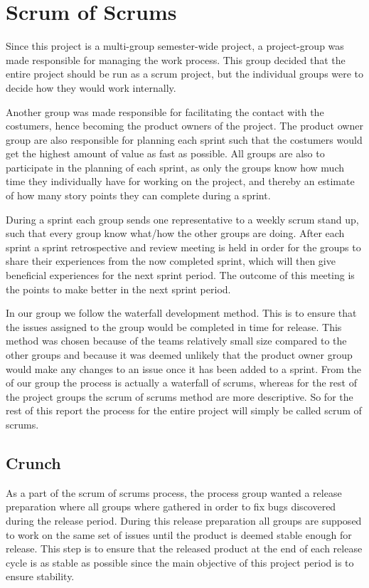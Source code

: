 \section{Scrum of Scrums}
Since this project is a multi-group semester-wide project, a project-group was made responsible for managing the work process.
This group decided that the entire project should be run as a scrum project, but the individual groups were to decide how they would work internally.

Another group was made responsible for facilitating the contact with the costumers, hence becoming the product owners of the project.
The product owner group are also responsible for planning each sprint such that the costumers would get the highest amount of value as fast as possible.
All groups are also to participate in the planning of each sprint, as only the groups know how much time they individually have for working on the project, and thereby an estimate of how many story points they can complete during a sprint.

During a sprint each group sends one representative to a weekly scrum stand up, such that every group know what/how the other groups are doing.
After each sprint a sprint retrospective and review meeting is held in order for the groups to share their experiences from the now completed sprint, which will then give beneficial experiences for the next sprint period.
The outcome of this meeting is the points to make better in the next sprint period.

In our group we follow the waterfall development method. 
This is to ensure that the issues assigned to the group would be completed in time for release. 
This method was chosen because of the teams relatively small size compared to the other groups and because it was deemed unlikely that the product owner group would make any changes to an issue once it has been added to a sprint.
From the of our group the process is actually a waterfall of scrums, whereas for the rest of the project groups the scrum of scrums method are more descriptive.
So for the rest of this report the process for the entire project will simply be called scrum of scrums.

\subsection{Crunch}
As a part of the scrum of scrums process, the process group wanted a release preparation where all groups where gathered in order to fix bugs discovered during the release period. 
During this release preparation all groups are supposed to work on the same set of issues until the product is deemed stable enough for release. 
This step is to ensure that the released product at the end of each release cycle is as stable as possible since the main objective of this project period is to ensure stability.
